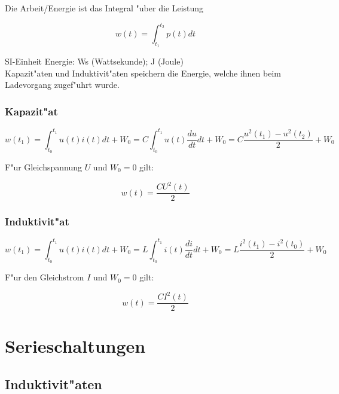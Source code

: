 \documentclass[german, 10pt, a4paper, headsepline]{scrreprt}
\theoremstyle{remark}
\begin{document}
Die Arbeit/Energie ist das Integral "uber die Leistung

\begin{displaymath}
	w(t) = \int^{t_2}_{t_1} p(t) dt
\end{displaymath}

SI-Einheit Energie: Ws (Wattsekunde); J (Joule)\\

Kapazit"aten und Induktivit"aten speichern die Energie, welche ihnen beim Ladevorgang zugef"uhrt wurde.

\subsubsection{Kapazit"at}

\begin{displaymath}
	w(t_1) = \int_{t_0}^{t_1}u(t)i(t) dt + W_0 = C\int^{t_1}_{t_0} u(t)\frac{du}{dt} dt + W_0=C\frac{u^2(t_1)-u^2(t_2)}{2} + W_0
\end{displaymath}

F"ur Gleichspannung $U$ und $W_0 = 0$ gilt:

\begin{displaymath}
	w(t)=\frac{CU^2(t)}{2}
\end{displaymath}

\subsubsection{Induktivit"at}

\begin{displaymath}
	w(t_1) = \int^{t_1}_{t_0} u(t)i(t) dt + W_0 =  L\int^{t_1}_{t_0} i(t)\frac{di}{dt} dt + W_0 =L\frac{i^2(t_1)-i^2(t_0)}{2} + W_0
\end{displaymath}

F"ur den Gleichstrom $I$ und $W_0 = 0$ gilt:

\begin{displaymath}
	w(t)=\frac{CI^2(t)}{2}
\end{displaymath}

\section{Serieschaltungen}

\subsection{Induktivit"aten}
\end{document}

